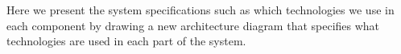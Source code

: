 Here we present the system specifications such as which technologies we use in each component by drawing a new architecture diagram that specifies what technologies are used in each part of the system.

